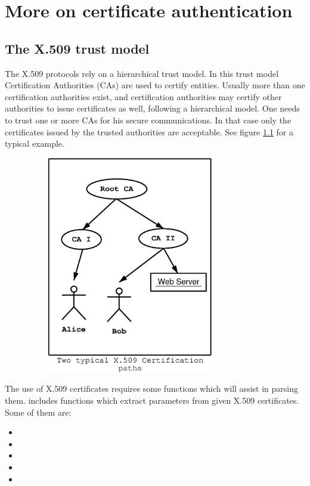 \chapter{More on certificate authentication}
\label{certificate}

\section{The X.509 trust model}
\label{x509:trust}

The X.509 protocols rely on a hierarchical trust model. In this trust model
Certification Authorities (CAs) are used to certify entities.
Usually more than one certification authorities exist, and certification
authorities may certify other authorities to issue certificates as well,
following a hierarchical model. 
One needs to trust one or more CAs for his secure
communications. In that case only the certificates issued by the trusted
authorities are acceptable. See figure \ref{fig:x509-1} for a typical example.

\begin{figure}[hbtp]
\includegraphics[height=9.5cm,width=9cm]{x509-1}
\label{fig:x509-1}
\end{figure}

\par The use of X.509 certificates requires some functions which will 
assist in parsing them. \gnutls{} includes functions which extract 
parameters from given X.509 certificates. Some of them are:
\begin{itemize}
\item {}
\item {}
\item {}
\item {}
\item {}
\end{itemize}

